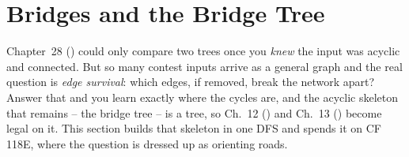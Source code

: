 \section{Bridges and the Bridge Tree}\label{sec:c31-bridges}

\begin{previouslybox}
Chapter~28 () could only compare two trees once you \emph{knew} the
input was acyclic and connected.  But so many contest inputs arrive as a general
graph and the real question is \emph{edge survival}: which edges, if removed,
break the network apart?  Answer that and you learn exactly where the cycles are,
and the acyclic skeleton that remains -- the bridge tree -- is a tree, so
Ch.~12 () and Ch.~13 () become legal on it.  This section
builds that skeleton in one DFS and spends it on CF 118E, where the question is
dressed up as orienting roads.
\end{previouslybox}


